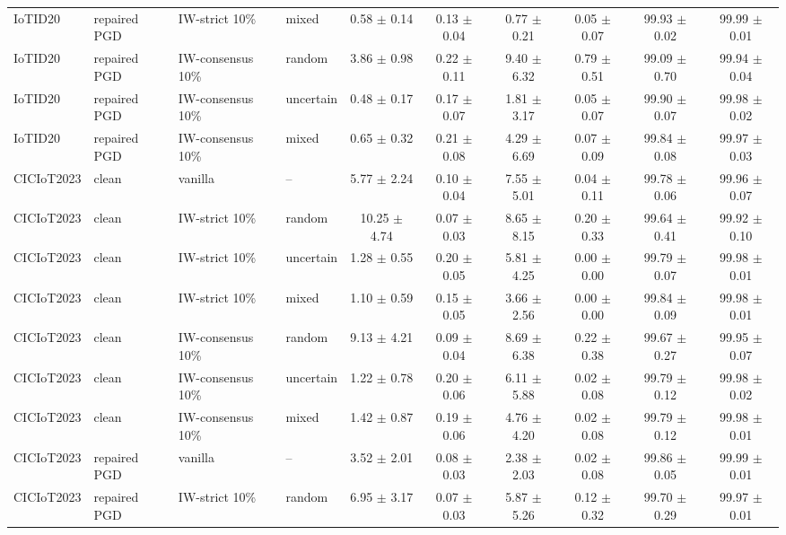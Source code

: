 \begin{table}[t]
\begin{tabular}{llllcccccc}
IoTID20 & repaired PGD & IW-strict 10\% & mixed & 0.58 $\pm$ 0.14 & 0.13 $\pm$ 0.04 & 0.77 $\pm$ 0.21 & 0.05 $\pm$ 0.07 & 99.93 $\pm$ 0.02 & 99.99 $\pm$ 0.01 \\
IoTID20 & repaired PGD & IW-consensus 10\% & random & 3.86 $\pm$ 0.98 & 0.22 $\pm$ 0.11 & 9.40 $\pm$ 6.32 & 0.79 $\pm$ 0.51 & 99.09 $\pm$ 0.70 & 99.94 $\pm$ 0.04 \\
IoTID20 & repaired PGD & IW-consensus 10\% & uncertain & 0.48 $\pm$ 0.17 & 0.17 $\pm$ 0.07 & 1.81 $\pm$ 3.17 & 0.05 $\pm$ 0.07 & 99.90 $\pm$ 0.07 & 99.98 $\pm$ 0.02 \\
IoTID20 & repaired PGD & IW-consensus 10\% & mixed & 0.65 $\pm$ 0.32 & 0.21 $\pm$ 0.08 & 4.29 $\pm$ 6.69 & 0.07 $\pm$ 0.09 & 99.84 $\pm$ 0.08 & 99.97 $\pm$ 0.03 \\
CICIoT2023 & clean & vanilla & -- & 5.77 $\pm$ 2.24 & 0.10 $\pm$ 0.04 & 7.55 $\pm$ 5.01 & 0.04 $\pm$ 0.11 & 99.78 $\pm$ 0.06 & 99.96 $\pm$ 0.07 \\
CICIoT2023 & clean & IW-strict 10\% & random & 10.25 $\pm$ 4.74 & 0.07 $\pm$ 0.03 & 8.65 $\pm$ 8.15 & 0.20 $\pm$ 0.33 & 99.64 $\pm$ 0.41 & 99.92 $\pm$ 0.10 \\
CICIoT2023 & clean & IW-strict 10\% & uncertain & 1.28 $\pm$ 0.55 & 0.20 $\pm$ 0.05 & 5.81 $\pm$ 4.25 & 0.00 $\pm$ 0.00 & 99.79 $\pm$ 0.07 & 99.98 $\pm$ 0.01 \\
CICIoT2023 & clean & IW-strict 10\% & mixed & 1.10 $\pm$ 0.59 & 0.15 $\pm$ 0.05 & 3.66 $\pm$ 2.56 & 0.00 $\pm$ 0.00 & 99.84 $\pm$ 0.09 & 99.98 $\pm$ 0.01 \\
CICIoT2023 & clean & IW-consensus 10\% & random & 9.13 $\pm$ 4.21 & 0.09 $\pm$ 0.04 & 8.69 $\pm$ 6.38 & 0.22 $\pm$ 0.38 & 99.67 $\pm$ 0.27 & 99.95 $\pm$ 0.07 \\
CICIoT2023 & clean & IW-consensus 10\% & uncertain & 1.22 $\pm$ 0.78 & 0.20 $\pm$ 0.06 & 6.11 $\pm$ 5.88 & 0.02 $\pm$ 0.08 & 99.79 $\pm$ 0.12 & 99.98 $\pm$ 0.02 \\
CICIoT2023 & clean & IW-consensus 10\% & mixed & 1.42 $\pm$ 0.87 & 0.19 $\pm$ 0.06 & 4.76 $\pm$ 4.20 & 0.02 $\pm$ 0.08 & 99.79 $\pm$ 0.12 & 99.98 $\pm$ 0.01 \\
CICIoT2023 & repaired PGD & vanilla & -- & 3.52 $\pm$ 2.01 & 0.08 $\pm$ 0.03 & 2.38 $\pm$ 2.03 & 0.02 $\pm$ 0.08 & 99.86 $\pm$ 0.05 & 99.99 $\pm$ 0.01 \\
CICIoT2023 & repaired PGD & IW-strict 10\% & random & 6.95 $\pm$ 3.17 & 0.07 $\pm$ 0.03 & 5.87 $\pm$ 5.26 & 0.12 $\pm$ 0.32 & 99.70 $\pm$ 0.29 & 99.97 $\pm$ 0.01 \\

\end{tabular}
\end{table}
